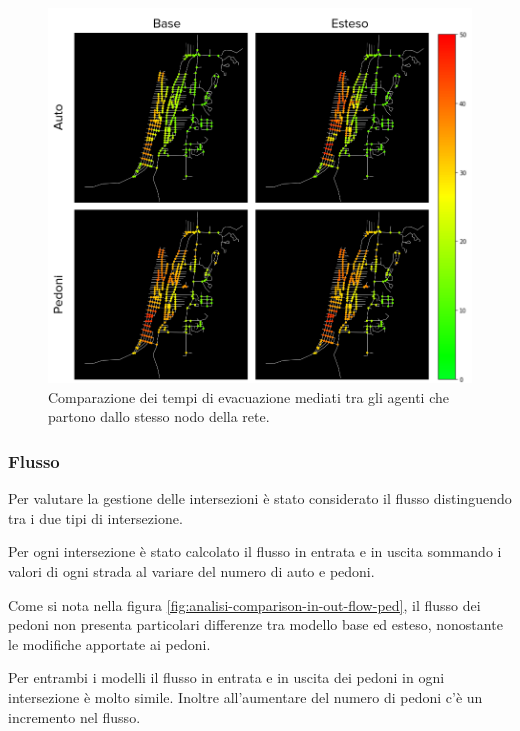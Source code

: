 \begin{figure}[ht]
    \centering
    \includegraphics[width=\textwidth]{images/analisi/comparison-evtimes-map.png}
    \caption{Comparazione dei tempi di evacuazione mediati tra gli agenti che partono dallo stesso nodo della rete. }
    \label{fig:analisi-comparison-ev-times-map}
\end{figure}

\pagebreak


\subsubsection*{Flusso}
Per valutare la gestione delle intersezioni è stato considerato il flusso distinguendo tra i due tipi di intersezione.

Per ogni intersezione è stato calcolato il flusso in entrata e in uscita sommando i valori di ogni strada al variare del numero di auto e pedoni.

Come si nota nella figura \ref{fig:analisi-comparison-in-out-flow-ped},
il flusso dei pedoni non presenta particolari differenze tra modello base ed esteso, nonostante le modifiche apportate ai pedoni.

Per entrambi i modelli il flusso in entrata e in uscita dei pedoni in ogni intersezione è molto simile.
Inoltre all'aumentare del numero di pedoni c'è un incremento nel flusso.


